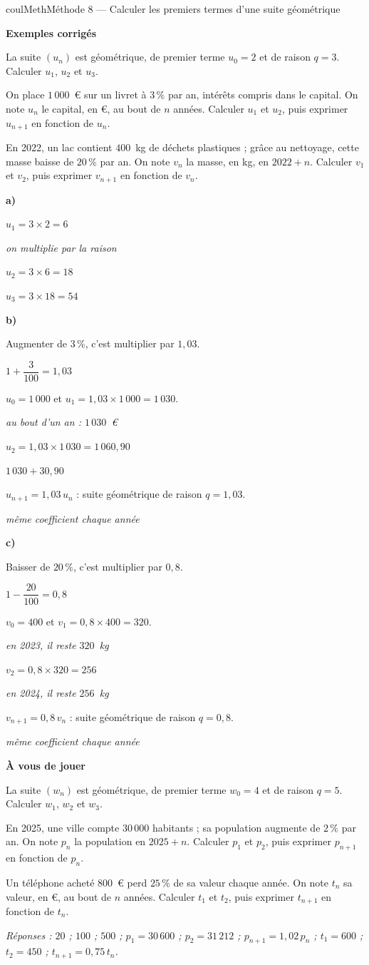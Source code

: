 \documentclass[11pt,a4paper]{article}
\makeatletter
\newcounter{lycee@signet}
\newcommand{\signet}[3][]{\stepcounter{lycee@signet}%
  \edef\lycee@dest{\if\relax\detokenize{#1}\relax
    signet.\arabic{lycee@signet}\else#1\fi}%
  \hypertarget{\lycee@dest}{}\bookmark[level=#2,dest=\lycee@dest]{#3}}
\newcommand{\res}[1]{#1}
\newcounter{methode}
\newenvironment{methodebox}[1][Méthode]{\stepcounter{methode}%
  \begin{boitecours}[phantom={\signet[methode-\arabic{methode}]{2}{#1}}]{coulMeth}{#1}}%
  {\end{boitecours}}
\newcommand{\etape}[1]{\par\smallskip\textbf{\color{coulMeth}#1}\par\nobreak\smallskip}
\newcommand{\reponse}[1]{\par\smallskip
  {\footnotesize\itshape\color{black!55}Réponses : #1}}
\newcommand{\explique}[2]{\par\smallskip\noindent
  \begin{minipage}[t]{0.57\linewidth}\raggedright #1\end{minipage}\hfill
  \begin{minipage}[t]{0.40\linewidth}\raggedright\leavevmode
    {\small\itshape\color{black!60}#2}\end{minipage}\par}
\newcommand{\cas}[1]{\par\smallskip\noindent\textbf{\color{coulExo}#1}\vadjust{\nobreak}}
\newenvironment{correction}{\par}{\par}
\newcommand{\etapeexemples}{\etape{Exemples corrigés}}
\makeatother
\begin{document}
\begin{methodebox}[Méthode 8 --- Calculer les premiers termes d'une suite géométrique]
\etapeexemples
\begin{questions}[label=\alph*)]
  \item La suite $(u_{n})$ est géométrique, de premier terme $u_{0}=2$ et de raison
        $q=3$. Calculer $u_{1}$, $u_{2}$ et $u_{3}$.
  \item On place $1\,000$~€ sur un livret à $3\,\%$ par an, intérêts compris dans le
        capital. On note $u_{n}$ le capital, en €, au bout de $n$ années. Calculer
        $u_{1}$ et $u_{2}$, puis exprimer $u_{n+1}$ en fonction de $u_{n}$.
  \item En 2022, un lac contient $400$~kg de déchets plastiques ; grâce au nettoyage,
        cette masse baisse de $20\,\%$ par an. On note $v_{n}$ la masse, en kg, en
        $2022+n$. Calculer $v_{1}$ et $v_{2}$, puis exprimer $v_{n+1}$ en fonction de
        $v_{n}$.
\end{questions}
\begin{correction}
\cas{a)}
\explique{$u_{1}=3\times 2=\res{6}$}{on multiplie par la raison}
\explique{$u_{2}=3\times 6=\res{18}$}{}
\explique{$u_{3}=3\times 18=\res{54}$}{}
\cas{b)}
\explique{Augmenter de $3\,\%$, c'est multiplier par $1{,}03$.}{$1+\dfrac{3}{100}=1{,}03$}
\explique{$u_{0}=1\,000$ et $u_{1}=1{,}03\times 1\,000=\res{1\,030}$.}{au bout d'un an :
$1\,030$~€}
\explique{$u_{2}=1{,}03\times 1\,030=\res{1\,060{,}90}$}{$1\,030+30{,}90$}
\explique{$u_{n+1}=\res{1{,}03\,u_{n}}$ : suite géométrique de raison $q=1{,}03$.}{même
coefficient chaque année}
\cas{c)}
\explique{Baisser de $20\,\%$, c'est multiplier par $0{,}8$.}{$1-\dfrac{20}{100}=0{,}8$}
\explique{$v_{0}=400$ et $v_{1}=0{,}8\times 400=\res{320}$.}{en 2023, il reste $320$~kg}
\explique{$v_{2}=0{,}8\times 320=\res{256}$}{en 2024, il reste $256$~kg}
\explique{$v_{n+1}=\res{0{,}8\,v_{n}}$ : suite géométrique de raison $q=0{,}8$.}{même
coefficient chaque année}
\end{correction}

\etape{À vous de jouer}
\begin{questions}
  \item La suite $(w_{n})$ est géométrique, de premier terme $w_{0}=4$ et de raison
        $q=5$. Calculer $w_{1}$, $w_{2}$ et $w_{3}$.
  \item En 2025, une ville compte $30\,000$ habitants ; sa population augmente de
        $2\,\%$ par an. On note $p_{n}$ la population en $2025+n$. Calculer $p_{1}$ et
        $p_{2}$, puis exprimer $p_{n+1}$ en fonction de $p_{n}$.
  \item Un téléphone acheté $800$~€ perd $25\,\%$ de sa valeur chaque année. On note
        $t_{n}$ sa valeur, en €, au bout de $n$ années. Calculer $t_{1}$ et $t_{2}$,
        puis exprimer $t_{n+1}$ en fonction de $t_{n}$.
\end{questions}
\reponse{$20$ ; $100$ ; $500$ ;\; $p_{1}=30\,600$ ; $p_{2}=31\,212$ ;
$p_{n+1}=1{,}02\,p_{n}$ ;\; $t_{1}=600$ ; $t_{2}=450$ ; $t_{n+1}=0{,}75\,t_{n}$.}
\end{methodebox}
\end{document}
